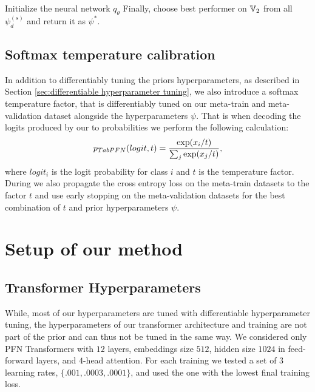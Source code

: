\documentclass{article}
\begin{document}
\begin{algorithm}[h!]
\SetAlgoLined
{}
 Initialize the neural network $q_\theta$\;
 Finally, choose best performer on $\mathbb{V}_2$ from all $\psi_d^{(s)}$ and return it as $\psi^*$.
 \caption{Differentiable Hyperparameter Tuning}
 \label{alg:differentiable_hyperparameter_tuning}
\end{algorithm}

\subsection{Softmax temperature calibration}
In addition to differentiably tuning the prior\textquotesingle{}s hyperparameters, as described in Section \ref{sec:differentiable hyperparameter tuning}, we also introduce a softmax temperature factor, that is differentiably tuned on our meta-train and meta-validation dataset alongside the hyperparameters $\psi$. That is when decoding the logits produced by our \methodname{} to probabilities we perform the following calculation:
%
$$p_{TabPFN{}}(logit, t) = \frac{\exp(x_i/t)}{\sum_j \exp(x_j/t)},$$
%
where $logit_i$ is the logit probability for class $i$ and $t$ is the temperature factor. During \priortuning{} we also propagate the cross entropy loss on the meta-train datasets to the factor $t$ and use early stopping on the meta-validation datasets for the best combination of $t$ and prior hyperparameters $\psi$.
\section{Setup of our method}
\label{sec:our_setup}

\subsection{Transformer Hyperparameters} %
While, most of our hyperparameters are tuned with differentiable hyperparameter tuning, the hyperparameters of our transformer architecture and training are not part of the prior and can thus not be tuned in the same way.
We considered only PFN Transformers with $12$ layers, embeddings size $512$, hidden size $1024$ in feed-forward layers, and $4$-head attention. For each training we tested a set of 3 learning rates, $\{.001,.0003,.0001\}$, and used the one with the lowest final training loss.
\end{document}
